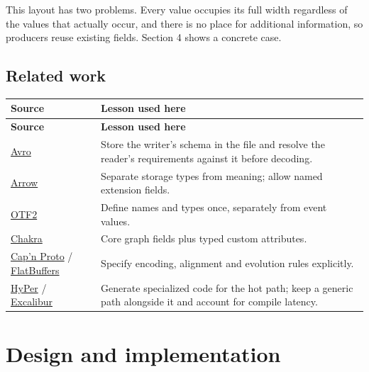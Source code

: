 \documentclass[10pt,a4paper]{article}
\begin{document}
This layout has two problems. Every value occupies its full width regardless of the values that actually occur, and there is no place for additional information, so producers reuse existing fields. Section 4 shows a concrete case.

\hypertarget{related-work}{}
\subsection{Related work}

{\small
\begin{longtable}{P{0.28\dimexpr{}\tabcolsep\relax}P{0.72\dimexpr{}\tabcolsep\relax}}
\toprule
\textbf{Source} & \textbf{Lesson used here} \\
\midrule
\endfirsthead
\toprule
\textbf{Source} & \textbf{Lesson used here} \\
\midrule
\endhead
\bottomrule
\endfoot
\href{\detokenize{https://avro.apache.org/docs/1.12.0/specification/#schema-resolution}}{Avro} & Store the writer's schema in the file and resolve the reader's requirements against it before decoding. \\
\href{\detokenize{https://arrow.apache.org/docs/format/Columnar.html#extension-types}}{Arrow} & Separate storage types from meaning; allow named extension fields. \\
\href{\detokenize{https://perftools.pages.jsc.fz-juelich.de/cicd/otf2/tags/latest/html/group__records__definition.html}}{OTF2} & Define names and types once, separately from event values. \\
\href{\detokenize{https://github.com/mlcommons/chakra/blob/main/schema/protobuf/et_def.proto}}{Chakra} & Core graph fields plus typed custom attributes. \\
\href{\detokenize{https://capnproto.org/encoding.html}}{Cap'n Proto} / \href{\detokenize{https://flatbuffers.dev/schema/}}{FlatBuffers} & Specify encoding, alignment and evolution rules explicitly. \\
\href{\detokenize{https://www.vldb.org/pvldb/vol4/p539-neumann.pdf}}{HyPer} / \href{\detokenize{https://www.vldb.org/pvldb/vol16/p829-boncz.pdf}}{Excalibur} & Generate specialized code for the hot path; keep a generic path alongside it and account for compile latency. \\
\end{longtable}
}

\hypertarget{design-and-implementation}{}
\section{Design and implementation}
\end{document}
